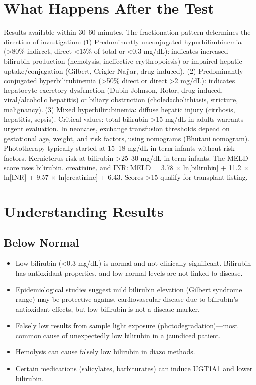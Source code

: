 \section*{What Happens After the Test}
Results available within 30--60 minutes. The fractionation pattern determines the direction of investigation: (1) Predominantly unconjugated hyperbilirubinemia (>80\% indirect, direct <15\% of total or <0.3 mg/dL): indicates increased bilirubin production (hemolysis, ineffective erythropoiesis) or impaired hepatic uptake/conjugation (Gilbert, Crigler-Najjar, drug-induced). (2) Predominantly conjugated hyperbilirubinemia (>50\% direct or direct >2 mg/dL): indicates hepatocyte excretory dysfunction (Dubin-Johnson, Rotor, drug-induced, viral/alcoholic hepatitis) or biliary obstruction (choledocholithiasis, stricture, malignancy). (3) Mixed hyperbilirubinemia: diffuse hepatic injury (cirrhosis, hepatitis, sepsis). Critical values: total bilirubin >15 mg/dL in adults warrants urgent evaluation. In neonates, exchange transfusion thresholds depend on gestational age, weight, and risk factors, using nomograms (Bhutani nomogram). Phototherapy typically started at 15--18 mg/dL in term infants without risk factors. Kernicterus risk at bilirubin >25--30 mg/dL in term infants. The MELD score uses bilirubin, creatinine, and INR: MELD = 3.78 $\times$ ln[bilirubin] + 11.2 $\times$ ln[INR] + 9.57 $\times$ ln[creatinine] + 6.43. Scores >15 qualify for transplant listing.

\section*{Understanding Results}

\subsection*{Below Normal}
\begin{itemize}
  \item Low bilirubin (<0.3 mg/dL) is normal and not clinically significant. Bilirubin has antioxidant properties, and low-normal levels are not linked to disease.
  \item Epidemiological studies suggest mild bilirubin elevation (Gilbert syndrome range) may be protective against cardiovascular disease due to bilirubin's antioxidant effects, but low bilirubin is not a disease marker.
  \item Falsely low results from sample light exposure (photodegradation)---most common cause of unexpectedly low bilirubin in a jaundiced patient.
  \item Hemolysis can cause falsely low bilirubin in diazo methods.
  \item Certain medications (salicylates, barbiturates) can induce UGT1A1 and lower bilirubin.
\end{itemize}

